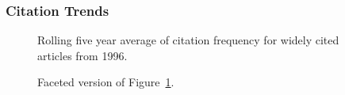 \documentclass[
  10pt,
  letterpaper,
  DIV=11,
  numbers=noendperiod,
  twoside]{scrartcl}
\begin{document}
\subsubsection*{Citation Trends}\label{citation-trends-20}

\begin{figure}


\caption{\label{fig-citation-spaghetti-1996}Rolling five year average of
citation frequency for widely cited articles from 1996.}

\end{figure}%

\begin{figure}


\caption{\label{fig-citation-facet-1996}Faceted version of
Figure~\ref{fig-citation-spaghetti-1996}.}

\end{figure}%
\end{document}
